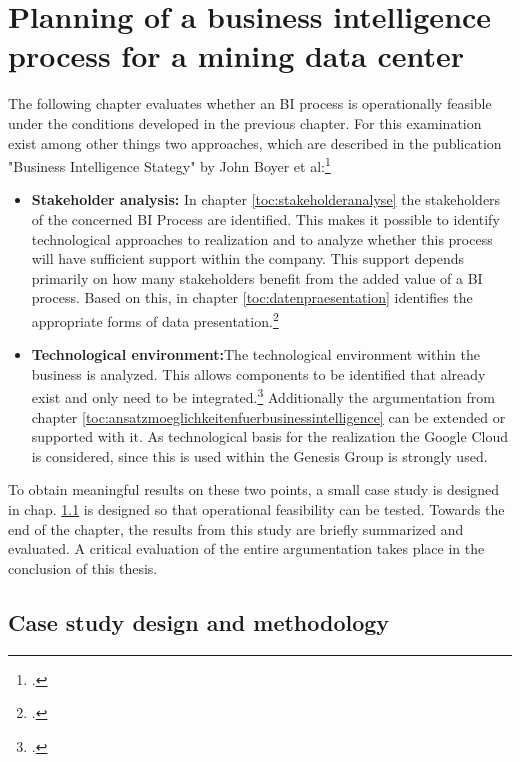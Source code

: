 \newpage
\section{Planning of a business intelligence process for a mining data center} \label{toc:planungeinesbiprozessesfuereinminingrechenzentrum}

The following chapter evaluates whether an \ac{BI} process is operationally feasible under the conditions developed in the previous chapter.
For this examination exist among other things two approaches, which are described in the publication
"Business Intelligence Stategy" by John Boyer et al:\footcite[Cf.][p. 102]{boyer2010business}

\begin{itemize}
    \item \textbf{Stakeholder analysis: } In chapter \ref{toc:stakeholderanalyse} the stakeholders of the concerned
    \ac{BI} Process are identified. This makes it possible to identify technological approaches to realization
    and to analyze whether this process will have sufficient support within the company. This support
    depends primarily on how many stakeholders benefit from the added value of a \ac{BI} process.
    Based on this, in chapter \ref{toc:datenpraesentation}
    identifies the appropriate forms of data presentation.\footcite[Cf.][p. 102]{boyer2010business}
    \item \textbf{Technological environment:}The technological environment within the business is analyzed.
    This allows components to be identified that already exist and only need to be integrated.\footcite[Cf.][p. 102]{boyer2010business} Additionally
    the argumentation from chapter \ref{toc:ansatzmoeglichkeitenfuerbusinessintelligence} can be extended or supported with it.
    As technological basis for the realization the Google Cloud is considered, since this is used within the
    Genesis Group is strongly used.
\end{itemize}

To obtain meaningful results on these two points, a small case study is designed in chap.
\ref{toc:fallstudiendesign} is designed so that operational feasibility can be tested. Towards the end of the chapter, the
results from this study are briefly summarized and evaluated. A critical evaluation of the entire argumentation takes place
in the conclusion of this thesis.

\subsection{Case study design and methodology} \label{toc:fallstudiendesign}

